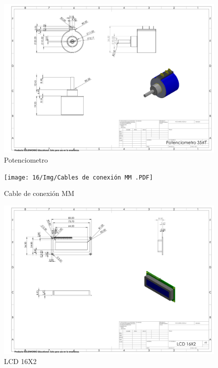     \begin{figure}[H]
        \centering
        \includegraphics[trim = {10mm 10mm 10mm 10mm},clip,scale=0.150]{16/Img/Potenciometro 1KOH.PDF}
        \caption{Potenciometro}
        \label{fig:Potenciometro}
    \end{figure}
    \begin{figure}[H]
        \centering
        \texttt{[image: 16/Img/Cables de conexión MM .PDF]}
        \caption{Cable de conexión MM}
        \label{fig:Cable de conexión MM}
    \end{figure}
    \begin{figure}[H]
        \centering
        \includegraphics[trim = {10mm 10mm 10mm 10mm},clip,scale=0.150]{16/Img/LCD 16X2.PDF}
        \caption{LCD 16X2}
        \label{fig:LCD 16X2}
    \end{figure}

